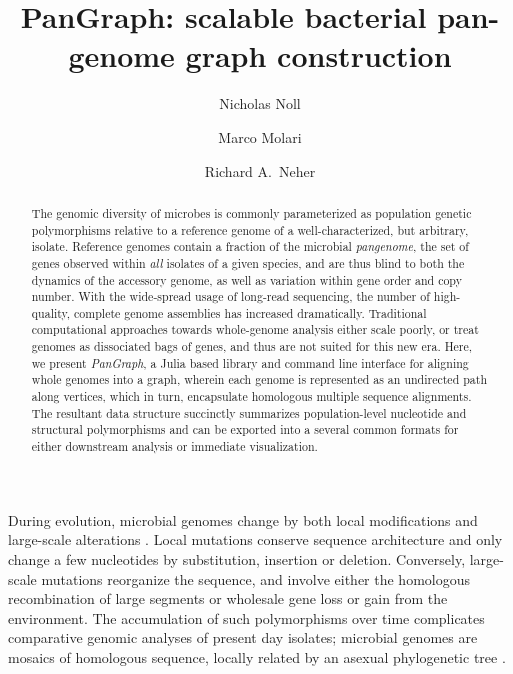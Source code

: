 \documentclass[aps,rmp,reprint,superscriptaddress,notitlepage,10pt]{revtex4-1}
\begin{document}
\title{PanGraph: scalable bacterial pan-genome graph construction}
\author{Nicholas Noll}
\author{Marco Molari}
\author{Richard A.~Neher}

\begin{abstract}
The genomic diversity of microbes is commonly parameterized as population genetic polymorphisms relative to a reference genome of a well-characterized, but arbitrary, isolate. 
Reference genomes contain a fraction of the microbial \emph{pangenome}, the set of genes observed within \emph{all} isolates of a given species, and are thus blind to both the dynamics of the accessory genome, as well as variation within gene order and copy number.
With the wide-spread usage of long-read sequencing, the number of high-quality, complete genome assemblies has increased dramatically.
Traditional computational approaches towards whole-genome analysis either scale poorly, or treat genomes as dissociated bags of genes, and thus are not suited for this new era.
Here, we present \emph{PanGraph}, a Julia based library and command line interface for aligning whole genomes into a graph, wherein each genome is represented as an undirected path along vertices, which in turn, encapsulate homologous multiple sequence alignments.
The resultant data structure succinctly summarizes population-level nucleotide and structural polymorphisms and can be exported into a several common formats for either downstream analysis or immediate visualization.
\end{abstract}

\maketitle

During evolution, microbial genomes change by both local modifications and large-scale alterations \cite{arnold2021horizontal}.
Local mutations conserve sequence architecture and only change a few nucleotides by substitution, insertion or deletion.
Conversely, large-scale mutations reorganize the sequence, and involve either the homologous recombination of large segments or wholesale gene loss or gain from the environment.
The accumulation of such polymorphisms over time complicates comparative genomic analyses of present day isolates; microbial genomes are mosaics of homologous sequence, locally related by an asexual phylogenetic tree \cite{sakoparnig2021whole}.
\end{document}
